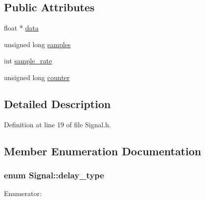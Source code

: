 \subsection*{\-Public \-Attributes}
\begin{DoxyCompactItemize}
\item 
float $\ast$ \hyperlink{class_signal_aa9322b424cb7f66597c8ab19ac402423}{data}
\item 
unsigned long \hyperlink{class_signal_a8a51dd9d0f5937b3f3406e66a4d8fc57}{samples}
\item 
int \hyperlink{class_signal_ad07ccb1653bcd36f89f095c7bf7ae877}{sample\-\_\-rate}
\item 
unsigned long \hyperlink{class_signal_a694ee28f771b11f0bb8a2bd4e180bb12}{counter}
\end{DoxyCompactItemize}


\subsection{\-Detailed \-Description}


\-Definition at line 19 of file \-Signal.\-h.



\subsection{\-Member \-Enumeration \-Documentation}
\hypertarget{class_signal_a45a2f1394f9d0be6fbaaf5160fa4817c}{
\subsubsection[{delay\-\_\-type}]{\setlength{\rightskip}{0pt plus 5cm}enum {\bf \-Signal\-::delay\-\_\-type}}}\label{class_signal_a45a2f1394f9d0be6fbaaf5160fa4817c}
\begin{Desc}
\item[\-Enumerator\-: ]\par
\begin{description}
\item[{\em 
\hypertarget{class_signal_a45a2f1394f9d0be6fbaaf5160fa4817caef04e6566ce27c94225e907c909af620}{\-M\-S}\label{class_signal_a45a2f1394f9d0be6fbaaf5160fa4817caef04e6566ce27c94225e907c909af620}
}]\item[{\em 
\hypertarget{class_signal_a45a2f1394f9d0be6fbaaf5160fa4817ca29508a29e1f1dfb176239b6eb843c53d}{\-S\-A\-M\-P\-L\-E}\label{class_signal_a45a2f1394f9d0be6fbaaf5160fa4817ca29508a29e1f1dfb176239b6eb843c53d}
}]\end{description}
\end{Desc}




